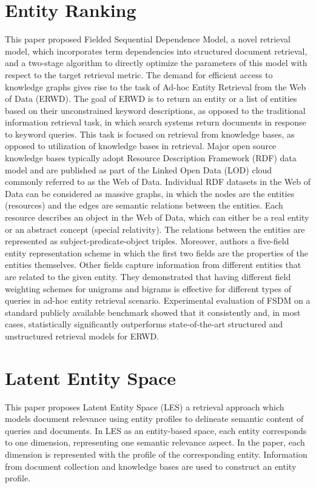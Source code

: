 \documentclass[letterpaper,12pt]{article}
\begin{document}
\section{Entity Ranking}
This paper proposed Fielded Sequential Dependence Model,
a novel retrieval model, which incorporates term dependencies into structured document retrieval, and a two-stage algorithm to directly optimize the parameters of this model with respect to the target retrieval metric. The demand for efficient access to knowledge graphs gives rise to the task of Ad-hoc Entity Retrieval from the Web of Data (ERWD). The goal of ERWD is to return an entity or a list of entities based on their unconstrained keyword descriptions, as opposed to the traditional information retrieval task, in which search systems return documents in response to keyword queries. This task is focused on retrieval
from knowledge bases, as opposed to utilization of knowledge
bases in retrieval. Major open source knowledge bases typically adopt Resource Description Framework (RDF) data model and are published as part of the Linked Open Data (LOD) cloud commonly referred to as the Web of Data. Individual RDF datasets in the Web of Data can be considered as massive graphs, in which the nodes are the entities (resources) and the edges are semantic relations between the entities. Each resource describes an object in the Web of Data, which can either be a real entity or an abstract concept (special relativity). The relations between the entities are represented as subject-predicate-object triples. Moreover, authors a five-field entity representation scheme in which the first two fields are the properties of the entities themselves. Other fields capture information from different entities that are related to the given entity. They demonstrated that having different field weighting schemes for unigrams and bigrams is effective for different types of queries in ad-hoc entity retrieval scenario. Experimental
evaluation of FSDM on a standard publicly available benchmark showed that it consistently and, in most cases, statistically significantly outperforms state-of-the-art structured and unstructured retrieval models for ERWD.

\section{Latent Entity Space}
This paper proposes Latent Entity Space (LES) a retrieval approach which models document relevance using entity profiles to delineate semantic content of queries and documents. In LES as an entity-based space, each entity corresponds to one dimension, representing one semantic relevance aspect. In the paper, each dimension is represented with the profile of the corresponding entity. Information from document collection and knowledge bases are used to construct an entity profile. 
\end{document}
